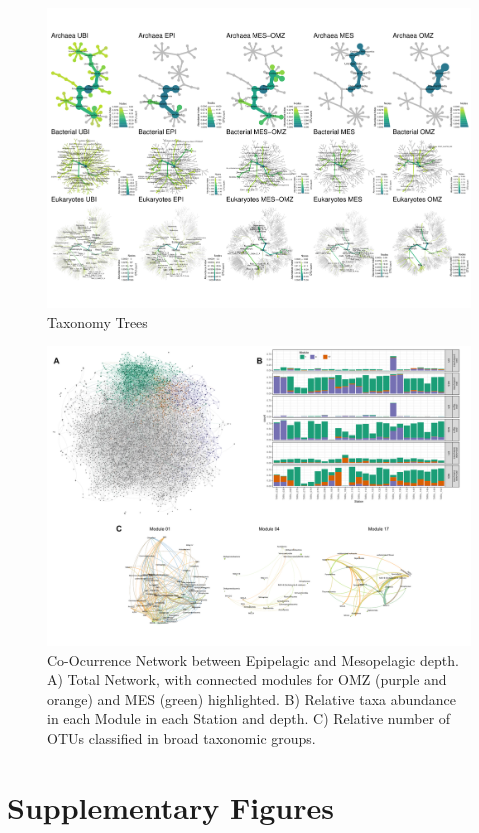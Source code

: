 \documentclass[fleqn,10pt]{wlscirep}
\begin{document}
\clearpage
\begin{figure}[ht]
    \centering
    \includegraphics[scale=0.7,angle=90,origin=c]{images/hmap_general_pub.pdf}
    \caption{Taxonomy Trees}
    \label{fig:tax_trees}
\end{figure}
\clearpage
\begin{figure}[ht]
    \centering
    \includegraphics[scale=0.5]{images/Networks_Composite_v2.pdf}
    \caption{Co-Ocurrence Network between Epipelagic and Mesopelagic depth. A) Total Network, with connected modules for OMZ (purple and orange) and MES (green) highlighted. B) Relative taxa abundance in each Module in each Station and depth. C) Relative number of OTUs classified in broad taxonomic groups.}
    \label{fig:networks}
\end{figure}
\clearpage
\section*{Supplementary Figures}
\end{document}
